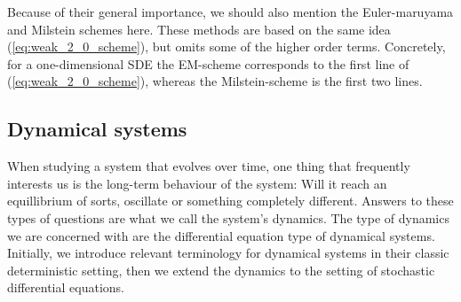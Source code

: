 Because of their general importance, we should also mention the Euler-maruyama and Milstein schemes here. These methods are based on the same idea (\ref{eq:weak_2_0_scheme}), but omits some of the higher order terms. Concretely, for a one-dimensional SDE the EM-scheme corresponds to the first line of (\ref{eq:weak_2_0_scheme}), whereas the Milstein-scheme is the first two lines.
\subsection{Dynamical systems}
When studying a system that evolves over time, one thing that frequently interests us is the long-term behaviour of the system: Will it reach an equillibrium of sorts, oscillate or something completely different. Answers to these types of questions are what we call the system's dynamics. The type of dynamics we are concerned with are the differential equation type of dynamical systems. Initially, we introduce relevant terminology for dynamical systems in their classic deterministic setting, then we extend the dynamics to the setting of stochastic differential equations. 
